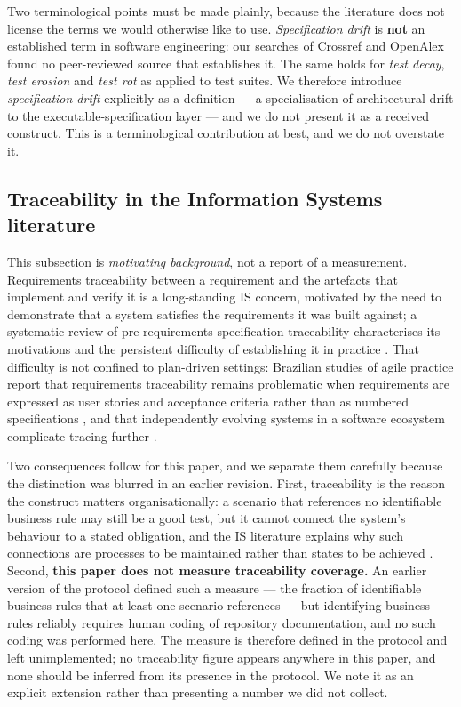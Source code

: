 Two terminological points must be made plainly, because the literature does not license the terms we
would otherwise like to use. \emph{Specification drift} is \textbf{not} an established term in
software engineering: our searches of Crossref and OpenAlex found no peer-reviewed source that
establishes it. The same holds for \emph{test decay}, \emph{test erosion} and \emph{test rot} as
applied to test suites. We therefore introduce \emph{specification drift} explicitly as a definition
--- a specialisation of architectural drift to the executable-specification layer --- and we do not
present it as a received construct. This is a terminological contribution at best, and we do not
overstate it.

\subsection{Traceability in the Information Systems literature}\label{sec:traceability}

This subsection is \emph{motivating background}, not a report of a measurement. Requirements
traceability between a requirement and the artefacts that implement and verify it is a long-standing
IS concern, motivated by the need to demonstrate that a system satisfies the requirements it was built
against; a systematic review of pre-requirements-specification traceability characterises its
motivations and the persistent difficulty of establishing it in practice
\citep{mucha2024prerequirements}. That difficulty is not confined to plan-driven settings: Brazilian
studies of agile practice report that requirements traceability remains problematic when requirements
are expressed as user stories and acceptance criteria rather than as numbered specifications
\citep{trindade2016rastreabilidade}, and that independently evolving systems in a software ecosystem
complicate tracing further \citep{goncalves2022rastreabilidade}.

Two consequences follow for this paper, and we separate them carefully because the distinction was
blurred in an earlier revision. First, traceability is the reason the construct matters
organisationally: a scenario that references no identifiable business rule may still be a good test,
but it cannot connect the system's behaviour to a stated obligation, and the IS literature explains why
such connections are processes to be maintained rather than states to be achieved
\citep{henderson1993strategic}. Second, \textbf{this paper does not measure traceability coverage.} An
earlier version of the protocol defined such a measure --- the fraction of identifiable business rules
that at least one scenario references --- but identifying business rules reliably requires human coding
of repository documentation, and no such coding was performed here. The measure is therefore defined in
the protocol and left unimplemented; no traceability figure appears anywhere in this paper, and none
should be inferred from its presence in the protocol. We note it as an explicit extension rather than
presenting a number we did not collect.

